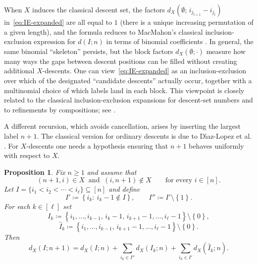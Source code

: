 \documentclass[12pt]{amsart}
\newtheorem{proposition}[theorem]{Proposition}
\theoremstyle{definition}
\theoremstyle{remark}
\newcommand{\set}[1]{\left\{#1\right\}}
\begin{document}
When $X$ induces the classical descent set, the factors $d_X(\emptyset;\,i_{j_{t+1}}-i_{j_t})$ in~\eqref{eq:IE-expanded}
are all equal to $1$ (there is a unique increasing permutation of a given length), and the formula reduces to
MacMahon's classical inclusion-exclusion expression for $d(I;n)$ in terms of binomial coefficients
\cite{macmahon1915combinatory}.  In general, the same binomial ``skeleton'' persists, but the block factors
$d_X(\emptyset;\cdot)$ measure how many ways the gaps between descent positions can be filled without creating
additional $X$-descents.  One can view~\eqref{eq:IE-expanded} as an inclusion-exclusion over which of the designated
``candidate descents'' actually occur, together with a multinomial choice of which labels land in each block.
This viewpoint is closely related to the classical inclusion-exclusion expansions for descent-set numbers and to refinements by compositions; see \cite{stanley-ec1}.



\medskip
A different recursion, which avoids cancellation, arises by inserting the largest label $n+1$.
The classical version for ordinary descents is due to D\'{\i}az-Lopez et al.
\cite{descentpolys}. For $X$-descents one needs a hypothesis ensuring that $n+1$ behaves uniformly with respect to $X$.

\begin{proposition}\label{prop:cancellationfree}
Fix $n\ge 1$ and assume that
\begin{equation}\label{eq:maximal-assumption}
(n{+}1,i)\in X\ \text{ and }\ (i,n{+}1)\notin X\qquad\text{for every }i\in[n].
\end{equation}
Let $I=\{i_1<i_2<\cdots<i_\ell\}\subseteq[n]$ and define
\[
I' \coloneqq \set{i_k:\ i_k-1\notin I},\qquad
I''\coloneqq I'\setminus\set{1}.
\]
For each $k\in[\ell]$ set
\[
I_k\coloneqq \set{i_1,\dots,i_{k-1},\,i_k-1,\,i_{k+1}-1,\dots,i_\ell-1}\setminus\set{0},
\]
\[
\widehat{I}_k\coloneqq \set{i_1,\dots,i_{k-1},\,i_{k+1}-1,\dots,i_\ell-1}\setminus\set{0}.
\]
Then
\begin{equation}\label{eq:insertion-recursion}
d_X(I;n{+}1)
=
d_X(I;n)
+
\sum_{i_k\in I''} d_X(I_k;n)
+
\sum_{i_k\in I'} d_X(\widehat{I}_k;n).
\end{equation}
\end{proposition}
\end{document}
